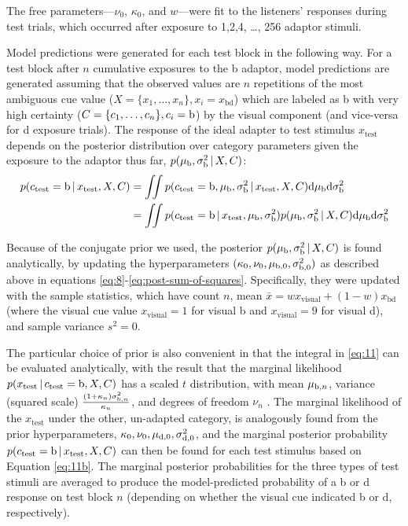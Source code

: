 The free parameters---$\nu_0$, $\kappa_0$, and $w$---were fit to the listeners' responses during test trials, which occurred after exposure to 1,2,4, \ldots, 256 adaptor stimuli.

Model predictions were generated for each test block in the following way.  For a test block after $n$ cumulative exposures to the \ph b adaptor, model predictions are generated assuming that the observed values are $n$ repetitions of the most ambiguous cue value ($X=\{x_1, \ldots, x_n\}, x_i=x_\mathrm{bd}$) which are labeled as \ph b with very high certainty ($C=\{c_1, \ldots, c_n\}, c_i=\mathrm{b}$) by the visual component (and vice-versa for \ph d exposure trials).
The response of the ideal adapter to test stimulus $x_\mathrm{test}$ depends on the posterior distribution over category parameters given the exposure to the adaptor thus far, $p(\mu_{\mathrm{b}}, \sigma^2_{\mathrm{b}} \,|\, X, C)$:
\begin{align}
  \label{eq:11}
  p(c_\mathrm{test}=\mathrm{b} \,|\, x_\mathrm{test}, X, C) &=   \iint p(c_\mathrm{test}=\mathrm{b}, \mu_{\mathrm{b}}, \sigma^2_{\mathrm{b}} \,|\, x_\mathrm{test}, X, C) \mathrm{d} \mu_{\mathrm{b}} \mathrm{d} \sigma^2_{\mathrm{b}} \\
  \label{eq:11b} &= \iint p(c_\mathrm{test}=\mathrm{b} \,|\, x_\mathrm{test}, \mu_{\mathrm{b}}, \sigma^2_{\mathrm{b}}) p(\mu_{\mathrm{b}}, \sigma^2_{\mathrm{b}} \,|\, X, C) \mathrm{d} \mu_{\mathrm{b}} \mathrm{d} \sigma^2_{\mathrm{b}}
\end{align}

Because of the conjugate prior we used, the posterior $p(\mu_{\mathrm{b}}, \sigma^2_{\mathrm{b}} \,|\, X, C)$ is found analytically, by updating the hyperparameters $(\kappa_0, \nu_0, \mu_{\mathrm{b},0}, \sigma^2_{\mathrm{b}, 0})$ as described above in equations \eqref{eq:8}-\eqref{eq:post-sum-of-squares}.  Specifically, they were updated with the sample statistics, which have count $n$, mean $\bar x = wx_\mathrm{visual} + (1-w) x_\mathrm{bd}$ (where the visual cue value $x_\mathrm{visual}=1$ for visual \ph b and $x_\mathrm{visual}=9$ for visual \ph d), and sample variance $s^2 = 0$.

The particular choice of prior is also convenient in that the integral in \eqref{eq:11} can be evaluated analytically, with the result that the marginal likelihood $p(x_\mathrm{test} \,|\, c_\mathrm{test} = \mathrm{b}, X, C)$ has a scaled $t$ distribution, with mean $\mu_{\mathrm{b}, n}$, variance (squared scale) $\frac{(1+\kappa_n) \sigma^2_{\mathrm{b}, n}}{\kappa_n}$, and degrees of freedom $\nu_n$ \autocite{Gelman2003}.  The marginal likelihood of the $x_\mathrm{test}$ under the other, un-adapted category, is analogously found from the prior hyperparameters, $\kappa_0, \nu_0, \mu_{\mathrm{d}, 0}, \sigma^2_{\mathrm{d}, 0}$, and the marginal posterior probability $p(c_\mathrm{test}=\mathrm{b} \,|\, x_\mathrm{test}, X, C)$ can then be found for each test stimulus based on Equation \ref{eq:11b}.  The marginal posterior probabilities for the three types of test stimuli are averaged to produce the model-predicted probability of a \ph b or \ph d response on test block $n$ (depending on whether the visual cue indicated \ph b or \ph d, respectively).

